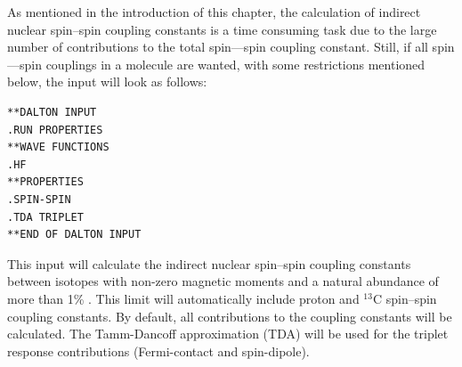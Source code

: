\begin{center}
\end{center}

As mentioned in the introduction of this chapter, the calculation of
indirect nuclear
spin--spin coupling constants is a time consuming task due to the
large number of contributions to the total spin---spin coupling
constant. Still, if all spin---spin couplings in a molecule are wanted,
with some restrictions mentioned below, the input will look as
follows:

\begin{verbatim}
**DALTON INPUT
.RUN PROPERTIES
**WAVE FUNCTIONS
.HF
**PROPERTIES
.SPIN-SPIN
.TDA TRIPLET
**END OF DALTON INPUT
\end{verbatim}

This input will calculate the indirect nuclear spin--spin
coupling
constants between isotopes with non-zero magnetic
moments and a
natural abundance of more than 1\% . This limit will
automatically
include proton and $^{13}$C spin--spin coupling constants. By default,
all contributions to the coupling constants will be calculated.
The Tamm-Dancoff approximation (TDA) will be used for the triplet response contributions
(Fermi-contact and spin-dipole).

